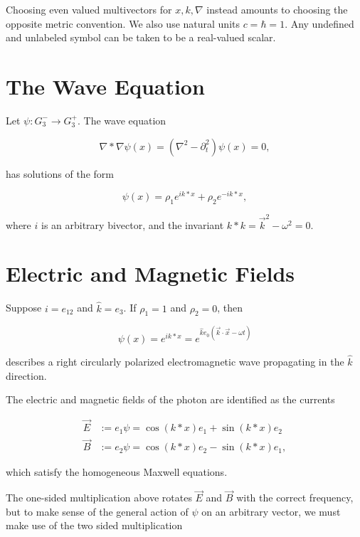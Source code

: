 \documentclass{birkjour}
\begin{document}
Choosing even valued multivectors for $x, k, \nabla$ instead amounts to choosing the opposite metric convention. We also use natural units $c = \hbar = 1$. Any undefined and unlabeled symbol can be taken to be a real-valued scalar.

\section{The Wave Equation}

Let $\psi : G_3^- \to G_3^+$. The wave equation

\begin{equation}
  \nabla * \nabla \psi(x) = (\nabla^2 - \partial_t^2) \psi(x) = 0,
\end{equation}

has solutions of the form

\begin{equation}
  \psi(x) = \rho_1 e^{i k * x} + \rho_2 e^{-i k * x}, \label{eq:super}
\end{equation}

where $i$ is an arbitrary bivector, and the invariant $k*k = \vec k^2 - \omega^2 = 0.$

\section{Electric and Magnetic Fields}

Suppose $i = e_{12}$ and $\hat k = e_3$. If $\rho_1 = 1$ and $\rho_2 = 0$, then 

\begin{equation}
  \psi(x) = e^{i k * x} = e^{\hat k e_0(\vec k \cdot \vec x - \omega t)} \label{eq:right}
\end{equation} 

describes a right circularly polarized electromagnetic wave propagating in the $\hat k$ direction. 

The electric and magnetic fields of the photon are identified as the currents

\begin{align}
  \vec E &:= e_1 \psi = \cos(k*x) e_1 + \sin(k*x) e_2\\ 
  \vec B &:= e_2 \psi = \cos(k*x) e_2 - \sin(k*x) e_1,
\end{align}

which satisfy the homogeneous Maxwell equations.

The one-sided multiplication above rotates $\vec E$ and $\vec B$ with the correct frequency, but to make sense of the general action of $\psi$ on an arbitrary vector, we must make use of the two sided multiplication
\end{document}
